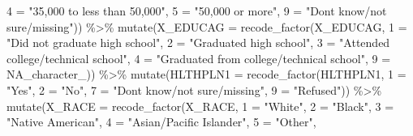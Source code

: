 \documentclass[
  letterpaper,
  DIV=11,
  numbers=noendperiod]{scrreprt}
\newenvironment{Shaded}{\begin{snugshade}}{\end{snugshade}}
\newcommand{\AttributeTok}[1]{\textcolor[rgb]{0.40,0.45,0.13}{#1}}
\newcommand{\ConstantTok}[1]{\textcolor[rgb]{0.56,0.35,0.01}{#1}}
\newcommand{\FunctionTok}[1]{\textcolor[rgb]{0.28,0.35,0.67}{#1}}
\newcommand{\NormalTok}[1]{\textcolor[rgb]{0.00,0.23,0.31}{#1}}
\newcommand{\OtherTok}[1]{\textcolor[rgb]{0.00,0.23,0.31}{#1}}
\newcommand{\SpecialCharTok}[1]{\textcolor[rgb]{0.37,0.37,0.37}{#1}}
\newcommand{\StringTok}[1]{\textcolor[rgb]{0.13,0.47,0.30}{#1}}
\begin{document}
\begin{itemize}
\begin{Shaded}
\begin{Highlighting}[]
        \StringTok{\textasciigrave{}}\AttributeTok{4}\StringTok{\textasciigrave{}} \OtherTok{=} \StringTok{"35,000 to less than 50,000"}\NormalTok{, }\StringTok{\textasciigrave{}}\AttributeTok{5}\StringTok{\textasciigrave{}} \OtherTok{=} \StringTok{"50,000 or more"}\NormalTok{, }\StringTok{\textasciigrave{}}\AttributeTok{9}\StringTok{\textasciigrave{}} \OtherTok{=} \StringTok{"Don\textquotesingle{}t know/not sure/missing"}\NormalTok{)) }\SpecialCharTok{\%\textgreater{}\%}
    \FunctionTok{mutate}\NormalTok{(}\AttributeTok{X\_EDUCAG =} \FunctionTok{recode\_factor}\NormalTok{(X\_EDUCAG, }\StringTok{\textasciigrave{}}\AttributeTok{1}\StringTok{\textasciigrave{}} \OtherTok{=} \StringTok{"Did not graduate high school"}\NormalTok{,}
        \StringTok{\textasciigrave{}}\AttributeTok{2}\StringTok{\textasciigrave{}} \OtherTok{=} \StringTok{"Graduated high school"}\NormalTok{, }\StringTok{\textasciigrave{}}\AttributeTok{3}\StringTok{\textasciigrave{}} \OtherTok{=} \StringTok{"Attended college/technical school"}\NormalTok{,}
        \StringTok{\textasciigrave{}}\AttributeTok{4}\StringTok{\textasciigrave{}} \OtherTok{=} \StringTok{"Graduated from college/technical school"}\NormalTok{, }\StringTok{\textasciigrave{}}\AttributeTok{9}\StringTok{\textasciigrave{}} \OtherTok{=} \ConstantTok{NA\_character\_}\NormalTok{)) }\SpecialCharTok{\%\textgreater{}\%}
    \FunctionTok{mutate}\NormalTok{(}\AttributeTok{HLTHPLN1 =} \FunctionTok{recode\_factor}\NormalTok{(HLTHPLN1, }\StringTok{\textasciigrave{}}\AttributeTok{1}\StringTok{\textasciigrave{}} \OtherTok{=} \StringTok{"Yes"}\NormalTok{, }\StringTok{\textasciigrave{}}\AttributeTok{2}\StringTok{\textasciigrave{}} \OtherTok{=} \StringTok{"No"}\NormalTok{,}
        \StringTok{\textasciigrave{}}\AttributeTok{7}\StringTok{\textasciigrave{}} \OtherTok{=} \StringTok{"Don\textquotesingle{}t know/not sure/missing"}\NormalTok{, }\StringTok{\textasciigrave{}}\AttributeTok{9}\StringTok{\textasciigrave{}} \OtherTok{=} \StringTok{"Refused"}\NormalTok{)) }\SpecialCharTok{\%\textgreater{}\%}
    \FunctionTok{mutate}\NormalTok{(}\AttributeTok{X\_RACE =} \FunctionTok{recode\_factor}\NormalTok{(X\_RACE, }\StringTok{\textasciigrave{}}\AttributeTok{1}\StringTok{\textasciigrave{}} \OtherTok{=} \StringTok{"White"}\NormalTok{, }\StringTok{\textasciigrave{}}\AttributeTok{2}\StringTok{\textasciigrave{}} \OtherTok{=} \StringTok{"Black"}\NormalTok{,}
        \StringTok{\textasciigrave{}}\AttributeTok{3}\StringTok{\textasciigrave{}} \OtherTok{=} \StringTok{"Native American"}\NormalTok{, }\StringTok{\textasciigrave{}}\AttributeTok{4}\StringTok{\textasciigrave{}} \OtherTok{=} \StringTok{"Asian/Pacific Islander"}\NormalTok{, }\StringTok{\textasciigrave{}}\AttributeTok{5}\StringTok{\textasciigrave{}} \OtherTok{=} \StringTok{"Other"}\NormalTok{,}

\end{Highlighting}
\end{Shaded}
\end{itemize}
\end{document}

